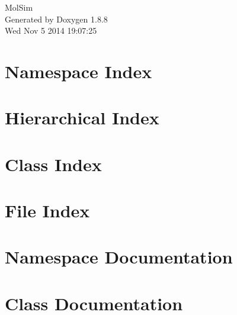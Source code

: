\documentclass[twoside]{book}
\newcommand{\+}{\discretionary{\mbox{\scriptsize$\hookleftarrow$}}{}{}}
\newcommand{\clearemptydoublepage}{%
  \newpage{\pagestyle{empty}\cleardoublepage}%
}
\begin{document}
\hypersetup{pageanchor=false,
             bookmarks=true,
             bookmarksnumbered=true,
             pdfencoding=unicode
            }
\begin{titlepage}
\vspace*{7cm}
\begin{center}%
{\Large Mol\+Sim }\\
\vspace*{1cm}
{\large Generated by Doxygen 1.8.8}\\
\vspace*{0.5cm}
{\small Wed Nov 5 2014 19:07:25}\\
\end{center}
\end{titlepage}
\clearemptydoublepage
\tableofcontents
\clearemptydoublepage
{}
\hypersetup{pageanchor=true}

\chapter{Namespace Index}

\chapter{Hierarchical Index}

\chapter{Class Index}

\chapter{File Index}

\chapter{Namespace Documentation}




\chapter{Class Documentation}





























\end{document}
